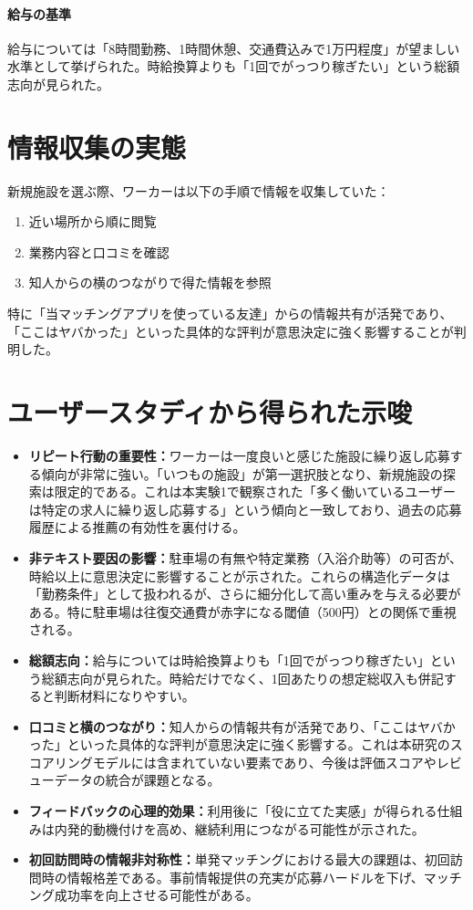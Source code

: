 \paragraph{給与の基準}
給与については「8時間勤務、1時間休憩、交通費込みで1万円程度」が望ましい水準として挙げられた。時給換算よりも「1回でがっつり稼ぎたい」という総額志向が見られた。

\section{情報収集の実態}
新規施設を選ぶ際、ワーカーは以下の手順で情報を収集していた：
\begin{enumerate}
\item 近い場所から順に閲覧
\item 業務内容と口コミを確認
\item 知人からの横のつながりで得た情報を参照
\end{enumerate}

特に「当マッチングアプリを使っている友達」からの情報共有が活発であり、「ここはヤバかった」といった具体的な評判が意思決定に強く影響することが判明した。

\section{ユーザースタディから得られた示唆}
\begin{itemize}
\item \textbf{リピート行動の重要性：}ワーカーは一度良いと感じた施設に繰り返し応募する傾向が非常に強い。「いつもの施設」が第一選択肢となり、新規施設の探索は限定的である。これは本実験1で観察された「多く働いているユーザーは特定の求人に繰り返し応募する」という傾向と一致しており、過去の応募履歴による推薦の有効性を裏付ける。
\item \textbf{非テキスト要因の影響：}駐車場の有無や特定業務（入浴介助等）の可否が、時給以上に意思決定に影響することが示された。これらの構造化データは「勤務条件」として扱われるが、さらに細分化して高い重みを与える必要がある。特に駐車場は往復交通費が赤字になる閾値（500円）との関係で重視される。
\item \textbf{総額志向：}給与については時給換算よりも「1回でがっつり稼ぎたい」という総額志向が見られた。時給だけでなく、1回あたりの想定総収入も併記すると判断材料になりやすい。
\item \textbf{口コミと横のつながり：}知人からの情報共有が活発であり、「ここはヤバかった」といった具体的な評判が意思決定に強く影響する。これは本研究のスコアリングモデルには含まれていない要素であり、今後は評価スコアやレビューデータの統合が課題となる。
\item \textbf{フィードバックの心理的効果：}利用後に「役に立てた実感」が得られる仕組みは内発的動機付けを高め、継続利用につながる可能性が示された。
\item \textbf{初回訪問時の情報非対称性：}単発マッチングにおける最大の課題は、初回訪問時の情報格差である。事前情報提供の充実が応募ハードルを下げ、マッチング成功率を向上させる可能性がある。
\end{itemize}

